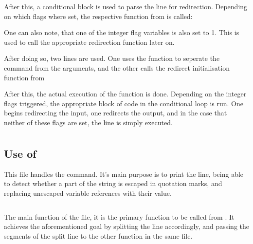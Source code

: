 \documentclass[12pt, a4paper]{report}
\begin{document}
                After this, a conditional  block is used to parse the line
                for redirection. Depending on which  flags where set, the
                respective function from  is called:

                \begingroup
                \fontsize{10pt}{10pt}\selectfont
                \endgroup
                One can also note, that one of the integer flag variables  is
                also set to 1. This is used to call the appropriate redirection function
                later on.

                After doing so, two lines are used. One uses the  function to
                seperate the command from the arguments, and the other calls the 
                redirect initialisation function from 

                \begingroup
                \fontsize{10pt}{10pt}\selectfont
                \endgroup
                After this, the actual execution of the function is done. Depending on 
                the integer flags triggered, the appropriate block of code in the
                conditional loop is run. One begins redirecting the input, one redirects
                the output, and in the case that neither of these flags are set, the
                line is simply executed.

                \begingroup
                \fontsize{10pt}{10pt}\selectfont
                \endgroup

        \section{}
            \subsection{Use of }
                This file handles the  command. It's main purpose
                is to print the line, being able to detect whether a part of
                the string is escaped in quotation marks, and replacing 
                unescaped variable references with their value.

            \subsection{}
                The main function of the file, it is the primary function to
                be called from . It achieves the aforementioned
                goal by splitting the line accordingly, and passing the 
                segments of the split line to the other function in the same file.
\end{document}
